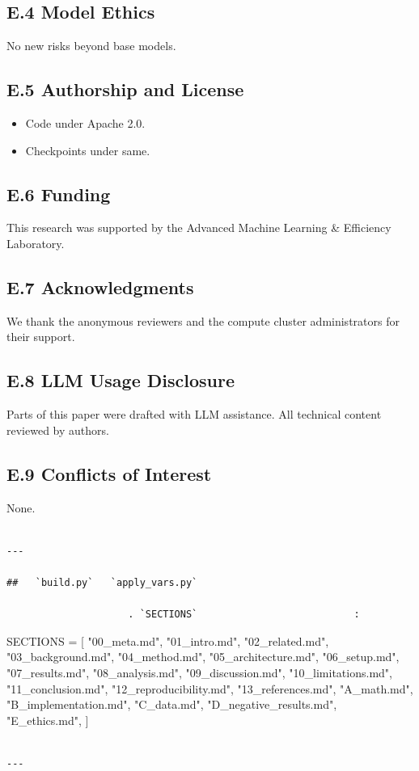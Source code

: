 \subsection{E.4 Model Ethics}

No new risks beyond base models.

\subsection{E.5 Authorship and License}

\begin{itemize}
\item Code under Apache 2.0.
\item Checkpoints under same.

\end{itemize}
\subsection{E.6 Funding}

This research was supported by the Advanced Machine Learning & Efficiency Laboratory.

\subsection{E.7 Acknowledgments}

We thank the anonymous reviewers and the compute cluster administrators for their support.

\subsection{E.8 LLM Usage Disclosure}

Parts of this paper were drafted with LLM assistance. All technical content 
reviewed by authors.

\subsection{E.9 Conflicts of Interest}

None.
\begin{lstlisting}

---

##   `build.py`   `apply_vars.py`

                     . `SECTIONS`                           :

\end{lstlisting}
SECTIONS = [
    "00\_meta.md", "01\_intro.md", "02\_related.md", "03\_background.md",
    "04\_method.md", "05\_architecture.md", "06\_setup.md", "07\_results.md",
    "08\_analysis.md", "09\_discussion.md", "10\_limitations.md",
    "11\_conclusion.md", "12\_reproducibility.md", "13\_references.md",
    "A\_math.md", "B\_implementation.md", "C\_data.md",
    "D\_negative\_results.md", "E\_ethics.md",
]
\begin{lstlisting}

---
\end{lstlisting}